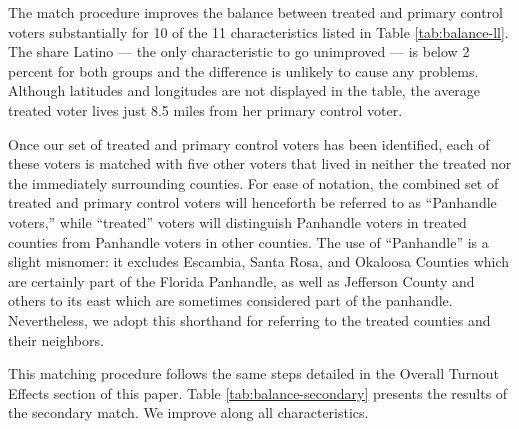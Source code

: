 \documentclass[
  12pt,
]{article}
\begin{document}
The match procedure improves the balance between treated and primary control voters substantially for 10 of the 11 characteristics listed in Table \ref{tab:balance-ll}. The share Latino --- the only characteristic to go unimproved --- is below 2 percent for both groups and the difference is unlikely to cause any problems. Although latitudes and longitudes are not displayed in the table, the average treated voter lives just 8.5 miles from her primary control voter.

Once our set of treated and primary control voters has been identified, each of these voters is matched with five other voters that lived in neither the treated nor the immediately surrounding counties. For ease of notation, the combined set of treated and primary control voters will henceforth be referred to as ``Panhandle voters,'' while ``treated'' voters will distinguish Panhandle voters in treated counties from Panhandle voters in other counties. The use of ``Panhandle'' is a slight misnomer: it excludes Escambia, Santa Rosa, and Okaloosa Counties which are certainly part of the Florida Panhandle, as well as Jefferson County and others to its east which are sometimes considered part of the panhandle. Nevertheless, we adopt this shorthand for referring to the treated counties and their neighbors.

This matching procedure follows the same steps detailed in the Overall Turnout Effects section of this paper. Table \ref{tab:balance-secondary} presents the results of the secondary match. We improve along all characteristics.
\end{document}
